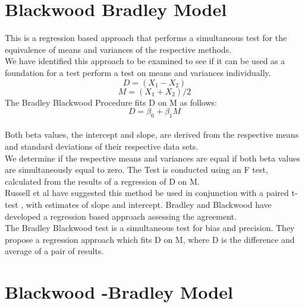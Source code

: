 \documentclass[12pt, a4paper]{report}
\theoremstyle{plain}
\theoremstyle{definition}
\theoremstyle{remark}
\begin{document}
	\section{Blackwood Bradley Model} This is a regression based
	approach that performs a simultaneous test for the equivalence of
	means and variances of the respective methods.\\We have identified
	this approach  to be examined to see if it can be used as a
	foundation for a test perform a test on
	means and variances individually.\\
	\begin{equation}
		D = (X_{1}-X_{2})
	\end{equation}
	\begin{equation}
		M = (X_{1} + X_{2}) /2
	\end{equation}
	The Bradley Blackwood Procedure fits D on M as follows:\\
	\begin{equation}
		D = \beta_{0} + \beta_{1}M
	\end{equation}
	\\Both beta values, the intercept and slope, are derived from the respective means and
	standard deviations of their respective data sets.\\
	We determine if the respective means and variances are equal if
	both beta values are simultaneously equal to zero. The Test is
	conducted using an F test, calculated from the results of a
	regression of D on M.
	\\
	Russell et al have suggested this method be used in conjunction
	with a paired t-test , with estimates of slope and intercept.
	Bradley and Blackwood have developed a regression based approach
	assessing the agreement.
	\\
	The Bradley Blackwood test is a simultaneous test for bias and
	precision. They propose a regression approach which fits D on M,
	where D is the difference and average of a pair of results.
	
	
	



	\section{Blackwood -Bradley Model} 
	
\end{document}
